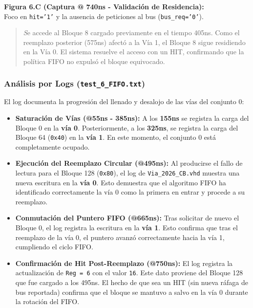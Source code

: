 \documentclass[12pt,a4paper]{article}
\begin{document}
\textbf{Figura 6.C (Captura @ 740ns - Validación de Residencia):} \\
Foco en \texttt{hit='1'} y la ausencia de peticiones al bus (\texttt{bus\_req='0'}).
\begin{quote}
    \textit Se accede al Bloque 8 cargado previamente en el tiempo 405ns. Como el reemplazo posterior (575ns) afectó a la Vía 1, el Bloque 8 sigue residiendo en la Vía 0. El sistema resuelve el acceso con un HIT, confirmando que la política FIFO no expulsó el bloque equivocado.
\end{quote}

\newpage
\subsubsection{Análisis por Logs (\texttt{test\_6\_FIFO.txt})}

El log documenta la progresión del llenado y desalojo de las vías del conjunto 0:

\begin{itemize}
    \item \textbf{Saturación de Vías (@55ns - 385ns):} A los \textbf{155ns} se registra la carga del Bloque 0 en la \textbf{vía 0}. Posteriormente, a los \textbf{325ns}, se registra la carga del Bloque 64 (\texttt{0x40}) en la \textbf{vía 1}. En este momento, el conjunto 0 está completamente ocupado.
    
    \item \textbf{Ejecución del Reemplazo Circular (@495ns):} Al producirse el fallo de lectura para el Bloque 128 (\texttt{0x80}), el log de \texttt{Via\_2026\_CB.vhd} muestra una nueva escritura en la \textbf{vía 0}. Esto demuestra que el algoritmo FIFO ha identificado correctamente la vía 0 como la primera en entrar y procede a su reemplazo.
    
    \item \textbf{Conmutación del Puntero FIFO (@665ns):} Tras solicitar de nuevo el Bloque 0, el log registra la escritura en la \textbf{vía 1}. Esto confirma que tras el reemplazo de la vía 0, el puntero avanzó correctamente hacia la vía 1, cumpliendo el ciclo FIFO.
    
    \item \textbf{Confirmación de Hit Post-Reemplazo (@750ns):} El log registra la actualización de \texttt{Reg = 6} con el valor \texttt{16}. Este dato proviene del Bloque 128 que fue cargado a los 495ns. El hecho de que sea un HIT (sin nueva ráfaga de bus reportada) confirma que el bloque se mantuvo a salvo en la vía 0 durante la rotación del FIFO.
\end{itemize}
\end{document}
